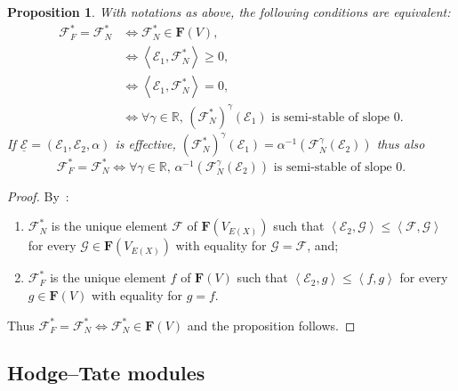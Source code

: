 \documentclass[11pt]{article}
\newtheorem{prop}[theo]{Proposition}
\theoremstyle{definition}
\numberwithin{equation}{section}
\numberwithin{figure}{section}
\numberwithin{table}{section}
\let\oldforall\forall
\renewcommand*{\forall}{\mathrel{\oldforall}}
\begin{document}
\begin{prop}\label{prop:EquivCond4Fargues=00003DNewton}
With notations as above, the following conditions are equivalent:
\begin{align*}
\mathcal{F}_{F}^{\ast}=\mathcal{F}_{N}^{\ast} & \iff \mathcal{F}_{N}^{\ast}\in\mathbf{F}(V),\\
& \iff \left\langle \mathcal{E}_{1},\mathcal{F}_{N}^{\ast}\right\rangle \geq0,\\
& \iff \left\langle \mathcal{E}_{1},\mathcal{F}_{N}^{\ast}\right\rangle =0,\\
& \iff {\forall\gamma\in\mathbb{R}},\,(\mathcal{F}_{N}^{\ast})^{\gamma}(\mathcal{E}_{1})\text{ is semi-stable of slope }0.
\end{align*}
If $\underline{\mathcal{E}}=(\mathcal{E}_{1},\mathcal{E}_{2},\alpha)$ is effective, $(\mathcal{F}_{N}^{\ast})^{\gamma}(\mathcal{E}_{1})=\alpha^{-1}(\mathcal{F}_{N}^{\gamma}(\mathcal{E}_{2}))$ thus also
\[
\mathcal{F}_{F}^{\ast}=\mathcal{F}_{N}^{\ast}\iff{\forall\gamma\in\mathbb{R}},\,\alpha^{-1}(\mathcal{F}_{N}^{\gamma}(\mathcal{E}_{2}))\text{ is semi-stable of slope }0.
\]
\end{prop}

\begin{proof}
By~\cite[Proposition~6]{Co16}:
\begin{enumerate}
\item $\mathcal{F}_{N}^{\ast}$ is the unique element $\mathcal{F}$ of $\mathbf{F}(V_{E(X)})$ such that $\left\langle\mathcal{E}_{2},\mathcal{G}\right\rangle \leq\left\langle\mathcal{F},\mathcal{G}\right\rangle $ for every $\mathcal{G}\in\mathbf{F}(V_{E(X)})$ with equality for $\mathcal{G}=\mathcal{F}$, and;
\item $\mathcal{F}_{F}^{\ast}$ is the unique element $f$ of $\mathbf{F}(V)$ such that $\left\langle\mathcal{E}_{2},g\right\rangle \leq\left\langle f,g\right\rangle $ for every $g\in\mathbf{F}(V)$ with equality for $g=f$.
\end{enumerate}
Thus $\mathcal{F}_{F}^{\ast}=\mathcal{F}_{N}^{\ast}\Leftrightarrow\mathcal{F}_{N}^{\ast}\in\mathbf{F}(V)$ and the proposition follows.
\end{proof}

\subsection{Hodge--Tate modules}\label{subsec:HodgeTateModDef}

\subsubsection{}
\end{document}

